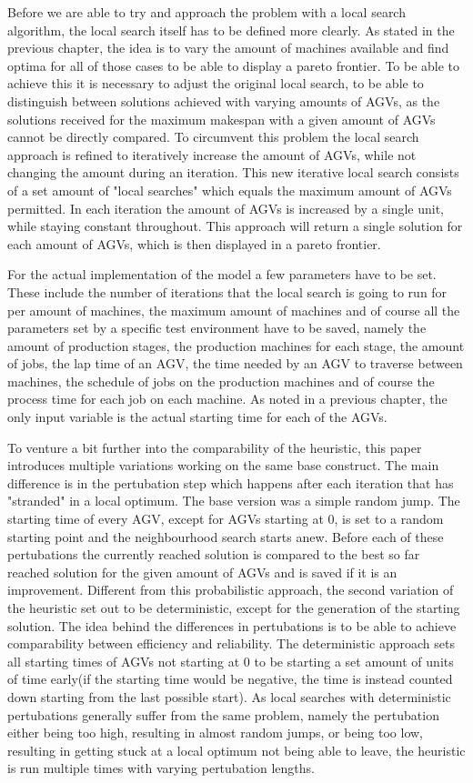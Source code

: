 Before we are able to try and approach the problem with a local search algorithm, the local search itself has to be defined more clearly. As stated
in the previous chapter, the idea is to vary the amount of machines available and find optima for all of those cases to be able to display a pareto
frontier. To be able to achieve this it is necessary to adjust the original local search, to be able to distinguish between solutions achieved with
varying amounts of AGVs, as the solutions received for the maximum makespan with a given amount of AGVs cannot be directly
compared. To circumvent this problem the local search approach is refined to iteratively increase the amount of AGVs, while not changing the amount
during an iteration. This new iterative local search consists of a set amount of "local searches" which equals the maximum amount of AGVs permitted.
In each iteration the amount of AGVs is increased by a single unit, while staying constant throughout. This approach will return a single solution for
each amount of AGVs, which is then displayed in a pareto frontier.

For the actual implementation of the model a few parameters have to be set. These include the number of iterations that the local search is going
to run for per amount of machines, the maximum amount of machines and of course all the parameters set by a specific test environment have to be
saved, namely the amount of production stages, the production machines for each stage, the amount of jobs, the lap time of an AGV, the time needed 
by an AGV to traverse between machines, the schedule of jobs on the production machines and of course the process time for each job on each machine.
As noted in a previous chapter, the only input variable is the actual starting time for each of the AGVs.

To venture a bit further into the comparability of the heuristic, this paper introduces multiple variations working on the same base construct.
The main difference is in the pertubation step which happens after each iteration that has "stranded" in a local optimum. The base version was
a simple random jump. The starting time of every AGV, except for AGVs starting at 0, is set to a random starting point and the neighbourhood
search starts anew. Before each of these pertubations the currently reached solution is compared to the best so far reached solution for the given
amount of AGVs and is saved if it is an improvement. Different from this probabilistic approach, the second variation of the heuristic set out to
be deterministic, except for the generation of the starting solution. The idea behind the differences in pertubations is to be able to achieve
comparability between efficiency and reliability. The deterministic approach sets all starting times of AGVs not starting at 0 to be starting
a set amount of units of time early(if the starting time would be negative, the time is instead counted down starting from the last possible start).
As local searches with deterministic pertubations generally suffer from the same problem, namely the pertubation either being too high, resulting
in almost random jumps, or being too low, resulting in getting stuck at a local optimum not being able to leave, the heuristic is run multiple
times with varying pertubation lengths.

